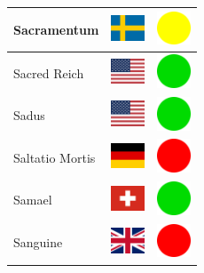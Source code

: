 \documentclass[12pt, a4paper, twoside]{report}
\begin{document}
\begin{center}
\begin{longtable}{|p{5cm}|p{2cm}|p{2cm}|}
 Sacramentum﻿                                                & \includegraphics[width=1cm]{../4x3/se} &   \includegraphics[width=1cm]{../likes/m} \\ \hline
 Sacred Reich                                               & \includegraphics[width=1cm]{../4x3/us} &   \includegraphics[width=1cm]{../likes/y} \\ \hline
 Sadus                                                      & \includegraphics[width=1cm]{../4x3/us} &   \includegraphics[width=1cm]{../likes/y} \\ \hline
 Saltatio Mortis                                            & \includegraphics[width=1cm]{../4x3/de} &   \includegraphics[width=1cm]{../likes/n} \\ \hline
 Samael                                                     & \includegraphics[width=1cm]{../4x3/ch} &   \includegraphics[width=1cm]{../likes/y} \\ \hline
 Sanguine                                                   & \includegraphics[width=1cm]{../4x3/gb} &   \includegraphics[width=1cm]{../likes/n} \\ \hline

\end{longtable}
\end{center}
\end{document}

